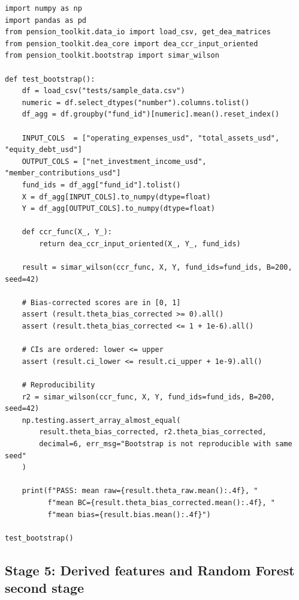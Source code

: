 \documentclass[12pt,a4paper]{article}
\begin{document}
\begin{lstlisting}[style=python, caption={Test: bias-corrected scores are in [0,1]; CIs are valid}]
import numpy as np
import pandas as pd
from pension_toolkit.data_io import load_csv, get_dea_matrices
from pension_toolkit.dea_core import dea_ccr_input_oriented
from pension_toolkit.bootstrap import simar_wilson

def test_bootstrap():
    df = load_csv("tests/sample_data.csv")
    numeric = df.select_dtypes("number").columns.tolist()
    df_agg = df.groupby("fund_id")[numeric].mean().reset_index()

    INPUT_COLS  = ["operating_expenses_usd", "total_assets_usd", "equity_debt_usd"]
    OUTPUT_COLS = ["net_investment_income_usd", "member_contributions_usd"]
    fund_ids = df_agg["fund_id"].tolist()
    X = df_agg[INPUT_COLS].to_numpy(dtype=float)
    Y = df_agg[OUTPUT_COLS].to_numpy(dtype=float)

    def ccr_func(X_, Y_):
        return dea_ccr_input_oriented(X_, Y_, fund_ids)

    result = simar_wilson(ccr_func, X, Y, fund_ids=fund_ids, B=200, seed=42)

    # Bias-corrected scores are in [0, 1]
    assert (result.theta_bias_corrected >= 0).all()
    assert (result.theta_bias_corrected <= 1 + 1e-6).all()

    # CIs are ordered: lower <= upper
    assert (result.ci_lower <= result.ci_upper + 1e-9).all()

    # Reproducibility
    r2 = simar_wilson(ccr_func, X, Y, fund_ids=fund_ids, B=200, seed=42)
    np.testing.assert_array_almost_equal(
        result.theta_bias_corrected, r2.theta_bias_corrected,
        decimal=6, err_msg="Bootstrap is not reproducible with same seed"
    )

    print(f"PASS: mean raw={result.theta_raw.mean():.4f}, "
          f"mean BC={result.theta_bias_corrected.mean():.4f}, "
          f"mean bias={result.bias.mean():.4f}")

test_bootstrap()
\end{lstlisting}

\subsection{Stage 5: Derived features and Random Forest second stage}
\end{document}
